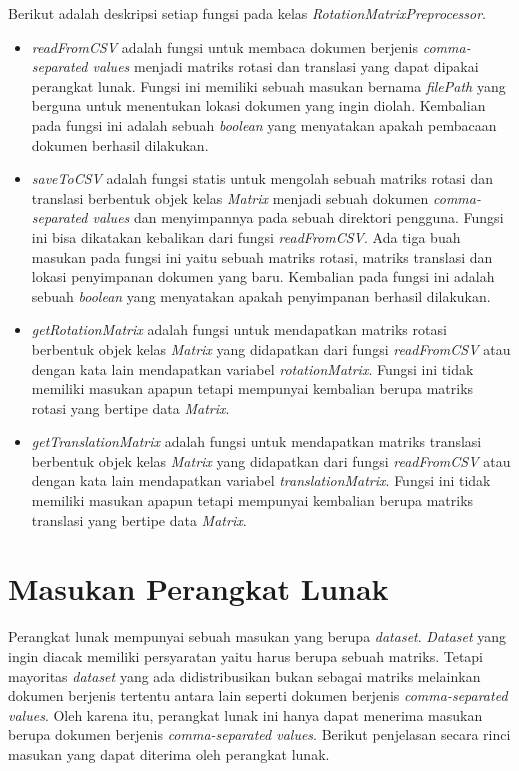 Berikut adalah deskripsi setiap fungsi pada kelas \textit{RotationMatrixPreprocessor}.
\begin{itemize}
	\item \textit{readFromCSV} adalah fungsi untuk membaca dokumen berjenis \textit{comma-separated values} menjadi matriks rotasi dan translasi yang dapat dipakai perangkat lunak. Fungsi ini memiliki sebuah masukan bernama \textit{filePath} yang berguna untuk menentukan lokasi dokumen yang ingin diolah. Kembalian pada fungsi ini adalah sebuah \textit{boolean} yang menyatakan apakah pembacaan dokumen berhasil dilakukan.
	\item \textit{saveToCSV} adalah fungsi statis untuk mengolah sebuah matriks rotasi dan translasi berbentuk objek kelas \textit{Matrix} menjadi sebuah dokumen \textit{comma-separated values} dan menyimpannya pada sebuah direktori pengguna. Fungsi ini bisa dikatakan kebalikan dari fungsi \textit{readFromCSV}. Ada tiga buah masukan pada fungsi ini yaitu sebuah matriks rotasi, matriks translasi dan lokasi penyimpanan dokumen yang baru. Kembalian pada fungsi ini adalah sebuah \textit{boolean} yang menyatakan apakah penyimpanan berhasil dilakukan.
	\item \textit{getRotationMatrix} adalah fungsi untuk mendapatkan matriks rotasi berbentuk objek kelas \textit{Matrix} yang didapatkan dari fungsi \textit{readFromCSV} atau dengan kata lain mendapatkan variabel \textit{rotationMatrix}. Fungsi ini tidak memiliki masukan apapun tetapi mempunyai kembalian berupa matriks rotasi yang bertipe data \textit{Matrix}.
	\item \textit{getTranslationMatrix} adalah fungsi untuk mendapatkan matriks translasi berbentuk objek kelas \textit{Matrix} yang didapatkan dari fungsi \textit{readFromCSV} atau dengan kata lain mendapatkan variabel \textit{translationMatrix}. Fungsi ini tidak memiliki masukan apapun tetapi mempunyai kembalian berupa matriks translasi yang bertipe data \textit{Matrix}.
\end{itemize}

\section{Masukan Perangkat Lunak}
\label{sec:masukan-pl}

Perangkat lunak mempunyai sebuah masukan yang berupa \textit{dataset}. \textit{Dataset} yang ingin diacak memiliki persyaratan yaitu harus berupa sebuah matriks. Tetapi mayoritas \textit{dataset} yang ada didistribusikan bukan sebagai matriks melainkan dokumen berjenis tertentu antara lain seperti dokumen berjenis \textit{comma-separated values}. Oleh karena itu, perangkat lunak ini hanya dapat menerima masukan berupa dokumen berjenis \textit{comma-separated values}. Berikut penjelasan secara rinci masukan yang dapat diterima oleh perangkat lunak.

